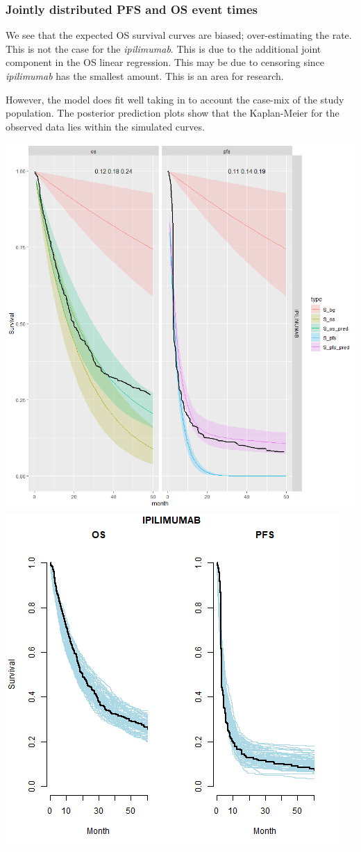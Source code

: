 \documentclass[
]{article}
\begin{document}
\hypertarget{jointly-distributed-pfs-and-os-event-times}{%
\subsubsection{Jointly distributed PFS and OS event
times}\label{jointly-distributed-pfs-and-os-event-times}}

We see that the expected OS survival curves are biased; over-estimating
the rate. This is not the case for the \emph{ipilimumab}. This is due to
the additional joint component in the OS linear regression. This may be
due to censoring since \emph{ipilimumab} has the smallest amount. This
is an area for research.

However, the model does fit well taking in to account the case-mix of
the study population. The posterior prediction plots show that the
Kaplan-Meier for the observed data lies within the simulated curves.

\begin{center}\includegraphics[width=0.4\linewidth]{../plots/S_plots_exp_exp_cf_separate_IPI_joint} \includegraphics[width=0.4\linewidth]{../plots/post_pred_joint_cf separate_exp_exp_IPILIMUMAB} \end{center}
\end{document}
